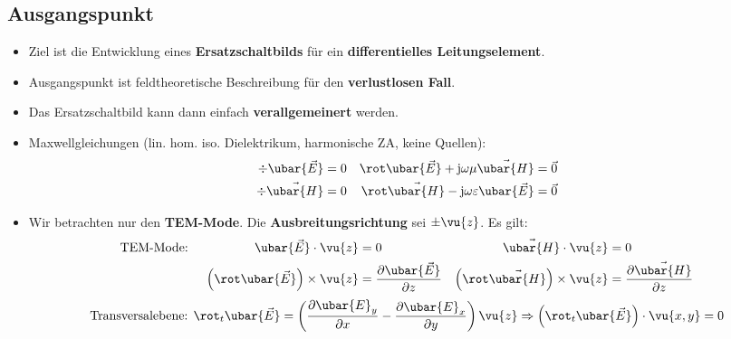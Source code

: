 \subsection{Ausgangspunkt}
\begin{itemize}
	\item Ziel ist die Entwicklung eines \textbf{Ersatzschaltbilds} für ein \textbf{differentielles Leitungselement}.
	\item Ausgangspunkt ist feldtheoretische Beschreibung für den \textbf{verlustlosen Fall}.
	\item Das Ersatzschaltbild kann dann einfach \textbf{verallgemeinert} werden.
	\item Maxwellgleichungen (lin. hom. iso. Dielektrikum, harmonische ZA, keine Quellen):
	\begin{align}
		\div \ubar{\vec{E}} & = 0 & \rot \ubar{\vec{E}} + \mathrm{j}\omega\mu \vec{\ubar{H}}         & =\vec{0} \\
		\div \vec{\ubar{H}} & = 0 & \rot \vec{\ubar{H}} - \mathrm{j}\omega\varepsilon \ubar{\vec{E}} & =\vec{0}
	\end{align}
	\item Wir betrachten nur den \textbf{TEM-Mode}. Die \textbf{Ausbreitungsrichtung} sei \(\pm\vu{z}\). Es gilt:
	\begin{align}
		\text{TEM-Mode: } &  & \ubar{\vec{E}}\cdot \vu{z}                    & =0                                           & \vec{\ubar{H}}\cdot \vu{z}                    & =0                                           \\
		&  & \left( \rot \ubar{\vec{E}}\right)\times\vu{z} & = \frac{\partial \ubar{\vec{E}}}{\partial z} & \left( \rot \vec{\ubar{H}}\right)\times\vu{z} & = \frac{\partial \vec{\ubar{H}}}{\partial z}
	\end{align}
	\begin{equation}
		\text{Transversalebene: }  \rot _t\ubar{\vec{E}} = \left( \frac{\partial \ubar{E}_y}{\partial x}-\frac{\partial \ubar{E}_x}{\partial y}\right)\vu{z} \Rightarrow\left(\rot _t\ubar{\vec{E}}\right)\cdot\vu{x,y} =0
	\end{equation}
\end{itemize}
